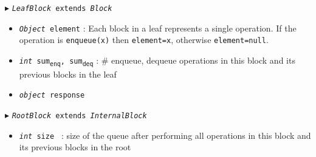\documentclass{article}
\newcommand{\sub}[1]{\textsubscript{#1}}
\renewcommand{\tt}[1]{\texttt{#1}}
\renewcommand{\sl}[1]{\textsl{#1}}
\newcommand{\size}{size }
\theoremstyle{definition}
\begin{document}
\begin{algorithm}
\begin{algorithmic}[1]
\Statex $\blacktriangleright$ \tt{\sl{LeafBlock} extends \sl{Block}}
\begin{itemize}
  \item \tt{\sl{Object} element}
  \textsf{: Each block in a leaf represents a single operation. If the operation is \tt{enqueue(x)} then \tt{element=x}, otherwise \tt{element=null}.}
  
    \item \tt{\sl{int} sum\sub{enq}, sum\sub{deq}}
  \textsf{: \# enqueue, dequeue operations in this block and its previous blocks in the leaf}

  \item {\color{red}\tt{\sl{object} response}}
\end{itemize}

\Statex $\blacktriangleright$ \tt{\sl{RootBlock} extends \sl{InternalBlock}}
\begin{itemize}
  \item \tt{\sl{int} \size}
  \textsf{: size of the queue after performing all operations in this block and its previous blocks in the root}
\end{itemize}

\end{algorithmic}
\end{algorithm}
\end{document}
